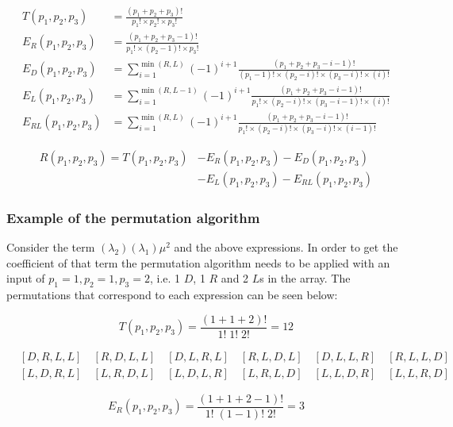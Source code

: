 \begin{align}
    T(p_1, p_2, p_3) &= \frac{(p_1 + p_2 + p_3)!}{p_1! \times p_2! \times p_3!} \\
    E_R(p_1, p_2, p_3) &= \frac{(p_1 + p_2 + p_3 - 1)!}
    {p_1! \times (p_2-1)! \times p_3!} \\
    E_D(p_1, p_2, p_3) &= \sum_{i=1}^{\min(R,L)} (-1)^{i+1}
    \frac{(p_1 + p_2 + p_3 - i - 1)!}
    {(p_1 - 1)! \times (p_2 - i)! \times (p_3 - i)! \times (i)!} \\
    E_L(p_1, p_2, p_3) &= \sum_{i=1}^{\min(R,L-1)} (-1)^{i+1}
    \frac{(p_1 + p_2 + p_3 - i - 1)!}
    {p_1! \times (p_2 - i)! \times (p_3 - i - 1)! \times (i)!} \\
    E_{RL}(p_1, p_2, p_3) &= \sum_{i=1}^{\min(R,L)} (-1)^{i+1}
    \frac{(p_1 + p_2 + p_3 - i - 1)!}
    {p_1! \times (p_2 - i)! \times (p_3 - i)! \times (i - 1)!}
\end{align}

\begin{align*}
    R(p_1, p_2, p_3) = T(p_1, p_2, p_3) & - E_R(p_1, p_2, p_3) -
    E_D(p_1, p_2, p_3) \\
    & - E_L(p_1, p_2, p_3) - E_{RL}(p_1, p_2, p_3)
\end{align*}

\subsubsection{Example of the permutation algorithm}
Consider the term \((\lambda_2) (\lambda_1) \mu^2\) and the above expressions.
In order to get the coefficient of that term the permutation algorithm needs to
be applied with an input of \(p_1=1, p_2=1, p_3=2\), i.e. 1 \(D\), 1 \(R\) and 2
\(L\)s in the array.
The permutations that correspond to each expression can be seen below:

\begin{equation*}
    T(p_1, p_2, p_3) = \frac{(1+1+2)!}{1! \; 1! \; 2!} = 12
\end{equation*}

\begin{align*}
    & [D, R, L, L] \quad [R, D, L, L] \quad [D, L, R, L] \quad
    [R, L, D, L] \quad [D, L, L, R] \quad [R, L, L, D] \\
    & [L, D, R, L] \quad [L, R, D, L] \quad [L, D, L, R] \quad
    [L, R, L, D] \quad [L, L, D, R] \quad [L, L, R, D]
\end{align*}

\begin{equation*}
    E_R(p_1, p_2, p_3) = \frac{(1+1+2-1)!}{1! \; (1-1)! \; 2!} = 3
\end{equation*}

